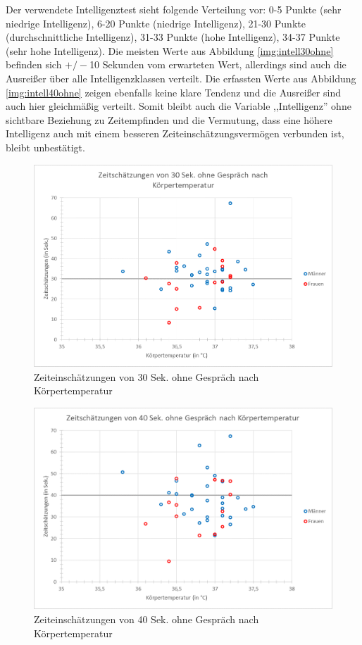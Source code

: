 \documentclass{Paper}
\begin{document}
Der verwendete Intelligenztest sieht folgende Verteilung vor: 0-5 Punkte (sehr niedrige Intelligenz), 6-20 Punkte (niedrige Intelligenz), 21-30 Punkte (durchschnittliche Intelligenz), 31-33 Punkte (hohe Intelligenz), 34-37 Punkte (sehr hohe Intelligenz). Die meisten Werte aus Abbildung \ref{img:intell30ohne} befinden sich  $+/-$10 Sekunden vom erwarteten Wert, allerdings sind auch die Ausreißer über alle Intelligenzklassen verteilt. Die erfassten Werte aus Abbildung \ref{img:intell40ohne} zeigen ebenfalls keine klare Tendenz und die Ausreißer sind auch hier gleichmäßig verteilt.  
Somit bleibt auch die Variable ,,Intelligenz'' ohne sichtbare Beziehung zu Zeitempfinden und die Vermutung, dass eine höhere Intelligenz auch mit einem besseren Zeiteinschätzungsvermögen verbunden ist, bleibt unbestätigt.






\begin{figure}[H]
	\centering
	\includegraphics[scale=0.7]{../Diagramme/scatterPre/30ohne_koerpertemperatur.png}
	\caption{Zeiteinschätzungen von 30 Sek. ohne Gespräch nach Körpertemperatur}
	\label{img:temp30ohne}
\end{figure}
\begin{figure}[H]
	\centering
	\includegraphics[scale=0.7]{../Diagramme/scatterPre/40ohne_koerpertemperatur.png}
	\caption{Zeiteinschätzungen von 40 Sek. ohne Gespräch nach Körpertemperatur}
	\label{img:temp40ohne}
\end{figure}
\end{document}
